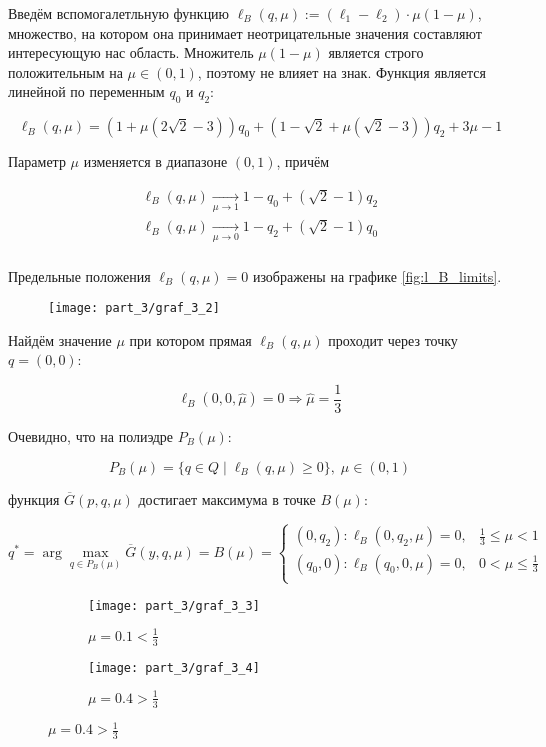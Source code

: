\begin{flushleft}
	Введём вспомогалетльную функцию	
 	$\ell_B(q, \mu):=(\ell_1-\ell_2) \cdot \mu(1-\mu)$,
 	множество, на котором она принимает неотрицательные значения 
 	составляют интересующую нас область. Множитель $\mu(1-\mu)$ является строго
 	положительным на $\mu \in (0,1)$, поэтому не влияет на знак. Функция
 	является линейной по переменным $q_0$ и $q_2$:
 	
	$$\ell_B(q, \mu) = 
	(1+\mu(2\sqrt{2}-3))q_0+
	(1-\sqrt{2}+\mu(\sqrt{2}-3))q_2
	+3\mu-1$$ 	
	
	Параметр $\mu$ изменяется в диапазоне $(0,1)$, причём	
	
	\begin{gather*}	
	\ell_B(q,\mu) \xrightarrow[\mu\rightarrow 1]{} 
	1-q_0+(\sqrt{2}-1)q_2\\	
	\ell_B(q,\mu) \xrightarrow[\mu\rightarrow 0]{} 	
	1-q_2+(\sqrt{2}-1)q_0\\
	\end{gather*}
	
	Предельные положения $\ell_B(q, \mu)=0$ изображены на графике \eqref{fig:l_B_limits}.
	
	\begin{figure}[H]
		\centering
  		\texttt{[image: part\_3/graf\_3\_2]}
  		\caption{}
  		\label{fig:l_B_limits}
	\end{figure}	
	
	Найдём значение $\mu$ при котором прямая $\ell_B(q, \mu)$ проходит через точку
	$q=(0,0)$:
	
	$$\ell_B(0,0,\hat \mu) = 0
	\Rightarrow \hat \mu = \frac{1}{3}$$	
	
	Очевидно, что на полиэдре $P_B(\mu):$
		
	$$P_B(\mu)=\{q \in Q \; | 
	\;  \ell_B(q, \mu) \geqslant 0 \}, \; \mu \in (0,1)$$
	
	функция $\overline{G}(p,q,\mu)$ достигает максимума в точке $B(\mu):$
	
	$$
	q^* = \arg \max \limits_{q\in P_B(\mu)} \overline G(y,q,\mu) = B(\mu)=
	\begin{cases}
		(0, q_2) : \ell_B(0,q_2,\mu)=0, & \frac{1}{3} \leqslant \mu < 1 \\
		(q_0, 0) : \ell_B(q_0,0,\mu)=0, & 0 < \mu \leqslant \frac{1}{3} \\
	\end{cases}	
	$$
	
	\begin{figure}[H]
    	\centering
     	\begin{subfigure}[b]{0.4 \textwidth}
        	\centering
        	\texttt{[image: part\_3/graf\_3\_3]}
        	\caption{$\mu=0.1 < \frac{1}{3}$}
         	\label{fig:y equals x}
     	\end{subfigure}
     	\hspace{10mm}
     	\begin{subfigure}[b]{0.4 \textwidth}
        	\centering
        	\texttt{[image: part\_3/graf\_3\_4]}
        	\caption{$\mu=0.4 > \frac{1}{3}$}
        	\label{fig:three sin x}
     	\end{subfigure}
	\end{figure}	


\end{flushleft}
